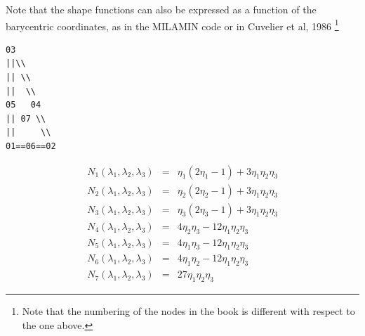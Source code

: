 Note that the shape functions can also be expressed as a function of the barycentric coordinates, 
as in the MILAMIN code \cite{daks08} or in Cuvelier et al, 1986 \cite{cuss86}\footnote{Note
that the numbering of the nodes in the book is different with respect to the one above. }

\begin{verbatim}
03          
||\\        
|| \\       
||  \\      
05   04     
|| 07 \\    
||     \\   
01==06==02    
\end{verbatim}

\begin{eqnarray}
N_1(\lambda_1,\lambda_2,\lambda_3) &=& \eta_1(2\eta_1-1)+ 3\eta_1\eta_2\eta_3\\
N_2(\lambda_1,\lambda_2,\lambda_3) &=& \eta_2(2\eta_2-1)+ 3\eta_1\eta_2\eta_3\\
N_3(\lambda_1,\lambda_2,\lambda_3) &=& \eta_3(2\eta_3-1)+ 3\eta_1\eta_2\eta_3\\
N_4(\lambda_1,\lambda_2,\lambda_3) &=& 4\eta_2\eta_3 - 12\eta_1\eta_2\eta_3\\
N_5(\lambda_1,\lambda_2,\lambda_3) &=& 4\eta_1\eta_3 - 12\eta_1\eta_2\eta_3\\
N_6(\lambda_1,\lambda_2,\lambda_3) &=& 4\eta_1\eta_2 - 12\eta_1\eta_2\eta_3\\
N_7(\lambda_1,\lambda_2,\lambda_3) &=& 27\eta_1\eta_2\eta_3 
\end{eqnarray}











